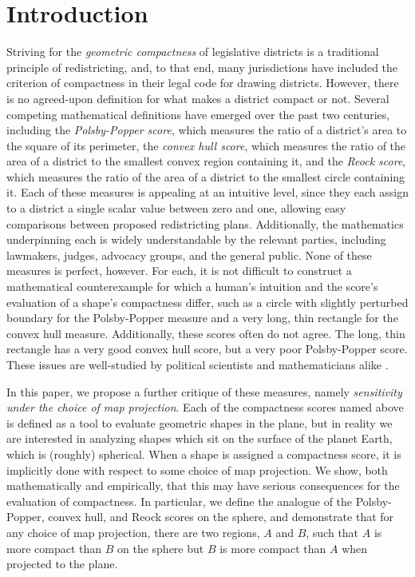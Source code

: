 \section{Introduction}\label{sec:intro}


Striving for the \textit{geometric compactness} of legislative districts is a traditional principle of redistricting, and, to that end, many jurisdictions have included the criterion of compactness in their legal code for drawing districts.  However, there is no agreed-upon definition for what makes a district compact or not.  Several competing mathematical definitions have emerged over the past two centuries, including the \textit{Polsby-Popper score}, which measures the ratio of a district's area to the square of its perimeter,  the \textit{convex hull score}, which measures the ratio of the area of a district to the smallest convex region containing it, and the \textit{Reock score}, which measures the ratio of the area of a district to the smallest circle containing it.  Each of these measures is appealing at an intuitive level, since they each assign to a district a single scalar value between zero and one, allowing easy comparisons between proposed redistricting plans. Additionally, the mathematics underpinning each is widely understandable by the relevant parties, including lawmakers, judges, advocacy groups, and the general public.  None of these measures is perfect, however.  For each, it is not difficult to construct a mathematical counterexample for which a human's intuition and the score's evaluation of a shape's compactness differ, such as a circle with slightly perturbed boundary for the Polsby-Popper measure and a very long, thin rectangle for the convex hull measure.  Additionally, these scores often do not agree.  The long, thin rectangle has a very good convex hull score, but a very poor Polsby-Popper score.  These issues are well-studied by political scientists and mathematicians alike \cite{polsby1991third,frolov1975shape,maceachren1985compact}.

In this paper, we propose a further critique of these measures, namely \textit{sensitivity under the choice of map projection}.  Each of the compactness scores named above is defined as a tool to evaluate geometric shapes in the plane, but in reality we are interested in analyzing shapes which sit on the surface of the planet Earth, which is (roughly) spherical.  When a shape is assigned a compactness score, it is implicitly done with respect to some choice of map projection.  We show, both mathematically and empirically, that this may have serious consequences for the evaluation of compactness.  In particular, we define the analogue of the Polsby-Popper, convex hull, and Reock scores on the sphere, and demonstrate that for any choice of map projection, there are two regions, $A$ and $B$, such that $A$ is more compact than $B$ on the sphere but $B$ is more compact than $A$ when projected to the plane.